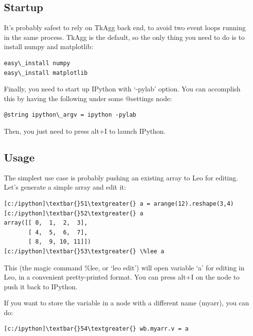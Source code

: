 \documentclass[a4paper,10pt,english]{sphinxmanual}
\begin{document}
\subsection{Startup}
\label{IPythonBridge:startup}
It's probably safest to rely on TkAgg back end, to avoid two event loops running
in the same process. TkAgg is the default, so the only thing you need to do is
to install numpy and matplotlib:

\begin{Verbatim}[commandchars=\\\{\}]
easy\_install numpy
easy\_install matplotlib
\end{Verbatim}

Finally, you need to start up IPython with `-pylab' option. You can accomplish
this by having the following under some @settings node:

\begin{Verbatim}[commandchars=\\\{\}]
@string ipython\_argv = ipython -pylab
\end{Verbatim}

Then, you just need to press alt+I to launch IPython.


\subsection{Usage}
\label{IPythonBridge:usage}
The simplest use case is probably pushing an existing array to Leo for editing.
Let's generate a simple array and edit it:

\begin{Verbatim}[commandchars=\\\{\}]
[c:/ipython]\textbar{}51\textgreater{} a = arange(12).reshape(3,4)
[c:/ipython]\textbar{}52\textgreater{} a
array([[ 0,  1,  2,  3],
       [ 4,  5,  6,  7],
       [ 8,  9, 10, 11]])
[c:/ipython]\textbar{}53\textgreater{} \%lee a
\end{Verbatim}

This (the magic command \%lee, or `leo edit') will open variable `a' for editing
in Leo, in a convenient pretty-printed format. You can press alt+I on the node
to push it back to IPython.

If you want to store the variable in a node with a different name (myarr), you can do:

\begin{Verbatim}[commandchars=\\\{\}]
[c:/ipython]\textbar{}54\textgreater{} wb.myarr.v = a
\end{Verbatim}
\end{document}
